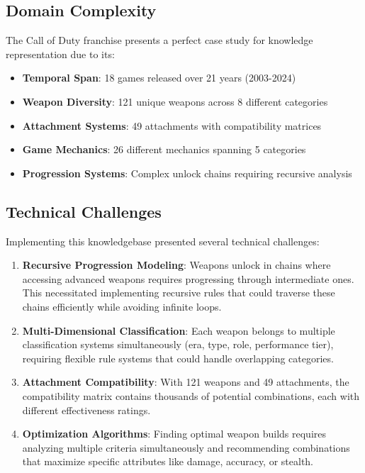\documentclass[12pt,a4paper]{article}
\begin{document}
\subsection{Domain Complexity}

The Call of Duty franchise presents a perfect case study for knowledge
representation due to its:

\begin{itemize}
    \item \textbf{Temporal Span}: 18 games released over 21 years (2003-2024)
    \item \textbf{Weapon Diversity}: 121 unique weapons across 8 different categories
    \item \textbf{Attachment Systems}: 49 attachments with compatibility matrices
    \item \textbf{Game Mechanics}: 26 different mechanics spanning 5 categories
    \item \textbf{Progression Systems}: Complex unlock chains requiring recursive analysis
\end{itemize}

\subsection{Technical Challenges}

Implementing this knowledgebase presented several technical challenges:

\begin{enumerate}
    \item \textbf{Recursive Progression Modeling}: Weapons unlock in chains where accessing advanced weapons requires progressing through intermediate ones. This necessitated implementing recursive rules that could traverse these chains efficiently while avoiding infinite loops.

    \item \textbf{Multi-Dimensional Classification}: Each weapon belongs to multiple classification systems simultaneously (era, type, role, performance tier), requiring flexible rule systems that could handle overlapping categories.

    \item \textbf{Attachment Compatibility}: With 121 weapons and 49 attachments, the compatibility matrix contains thousands of potential combinations, each with different effectiveness ratings.

    \item \textbf{Optimization Algorithms}: Finding optimal weapon builds requires analyzing multiple criteria simultaneously and recommending combinations that maximize specific attributes like damage, accuracy, or stealth.
\end{enumerate}
\end{document}
